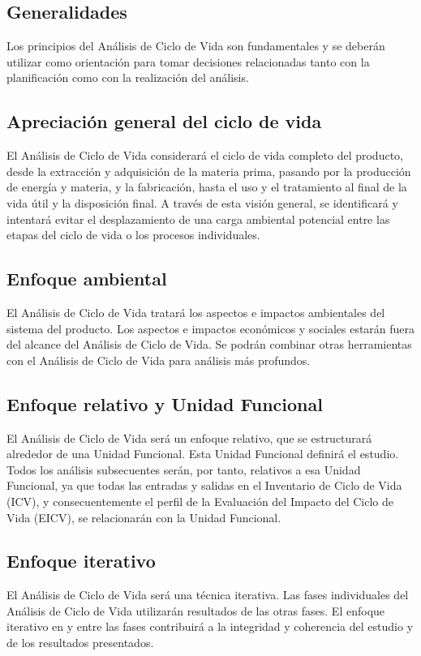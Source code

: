 \subsection{Generalidades}

Los principios del Análisis de Ciclo de Vida son fundamentales y se deberán utilizar como orientación para tomar decisiones relacionadas tanto con la planificación como con la realización del análisis.

\subsection{Apreciación general del ciclo de vida}

El Análisis de Ciclo de Vida considerará el ciclo de vida completo del producto, desde la extracción y adquisición de la materia prima, pasando por la producción de energía y materia, y la fabricación, hasta el uso y el tratamiento al final de la vida útil y la disposición final. A través de esta visión general, se identificará y intentará evitar el desplazamiento de una carga ambiental potencial entre las etapas del ciclo de vida o los procesos individuales.

\subsection{Enfoque ambiental}
El Análisis de Ciclo de Vida tratará los aspectos e impactos ambientales del sistema del producto. Los aspectos e impactos económicos y sociales estarán fuera del alcance del Análisis de Ciclo de Vida. Se podrán combinar otras herramientas con el Análisis de Ciclo de Vida para análisis más profundos.

\subsection{Enfoque relativo y Unidad Funcional}
El Análisis de Ciclo de Vida será un enfoque relativo, que se estructurará alrededor de una Unidad Funcional. Esta Unidad Funcional definirá el estudio. Todos los análisis subsecuentes serán, por tanto, relativos a esa Unidad Funcional, ya que todas las entradas y salidas en el Inventario de Ciclo de Vida (ICV), y consecuentemente el perfil de la Evaluación del Impacto del Ciclo de Vida (EICV), se relacionarán con la Unidad Funcional.

\subsection{Enfoque iterativo}
El Análisis de Ciclo de Vida será una técnica iterativa. Las fases individuales del Análisis de Ciclo de Vida utilizarán resultados de las otras fases. El enfoque iterativo en y entre las fases contribuirá a la integridad y coherencia del estudio y de los resultados presentados.

